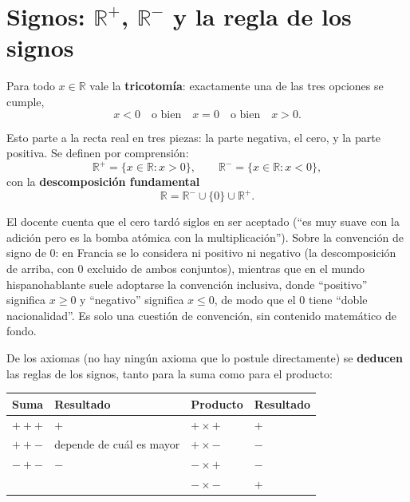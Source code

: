\documentclass[12pt,a4paper]{article}
\begin{document}
\section{Signos: $\mathbb{R}^+$, $\mathbb{R}^-$ y la regla de los signos}

Para todo $x \in \mathbb{R}$ vale la \textbf{tricotomía}: exactamente una de
las tres opciones se cumple,
$$x < 0 \quad \text{o bien} \quad x = 0 \quad \text{o bien} \quad x > 0.$$

Esto parte a la recta real en tres piezas: la parte negativa, el cero, y la
parte positiva. Se definen por comprensión:
$$\mathbb{R}^+ = \{x \in \mathbb{R} : x > 0\}, \qquad \mathbb{R}^- = \{x \in \mathbb{R} : x < 0\},$$
con la \textbf{descomposición fundamental}
$$\mathbb{R} = \mathbb{R}^- \cup \{0\} \cup \mathbb{R}^+.$$

\begin{notebox}
El docente cuenta que el cero tardó siglos en ser aceptado (``es muy suave
con la adición pero es la bomba atómica con la multiplicación''). Sobre la
convención de signo de $0$: en Francia se lo considera ni positivo ni
negativo (la descomposición de arriba, con $0$ excluido de ambos
conjuntos), mientras que en el mundo hispanohablante suele adoptarse la
convención inclusiva, donde ``positivo'' significa $x\geq 0$ y ``negativo''
significa $x \leq 0$, de modo que el $0$ tiene ``doble nacionalidad''. Es
solo una cuestión de convención, sin contenido matemático de fondo.
\end{notebox}

De los axiomas (no hay ningún axioma que lo postule directamente) se
\textbf{deducen} las reglas de los signos, tanto para la suma como para el
producto:

\begin{table}[H]
\centering
\begin{tabular}{@{}llll@{}}
\toprule
Suma & Resultado & Producto & Resultado \\
\midrule
$+ + +$ & $+$ & $+ \times +$ & $+$ \\
$+ + -$ & depende de cuál es mayor & $+ \times -$ & $-$ \\
$- + -$ & $-$ & $- \times +$ & $-$ \\
& & $- \times -$ & $+$ \\
\bottomrule
\end{tabular}
\end{table}
\end{document}
